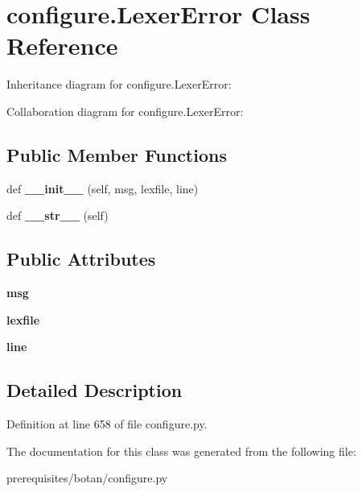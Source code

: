 \hypertarget{classconfigure_1_1_lexer_error}{}\section{configure.\+Lexer\+Error Class Reference}
\label{classconfigure_1_1_lexer_error}


Inheritance diagram for configure.\+Lexer\+Error\+:


Collaboration diagram for configure.\+Lexer\+Error\+:
\subsection*{Public Member Functions}
\begin{DoxyCompactItemize}
\item 
\mbox{\label{classconfigure_1_1_lexer_error_a1b7918032b3f84f04bd36fb068bbb0ce}} 
def {\bfseries \+\_\+\+\_\+init\+\_\+\+\_\+} (self, msg, lexfile, line)
\item 
\mbox{\label{classconfigure_1_1_lexer_error_af0750d0b6d213a8e76e6425e4654007c}} 
def {\bfseries \+\_\+\+\_\+str\+\_\+\+\_\+} (self)
\end{DoxyCompactItemize}
\subsection*{Public Attributes}
\begin{DoxyCompactItemize}
\item 
\mbox{\label{classconfigure_1_1_lexer_error_a9c246d550c7159c6b457ced90dce5b0a}} 
{\bfseries msg}
\item 
\mbox{\label{classconfigure_1_1_lexer_error_ae4ec849b5a31b24112a5c800f73c8126}} 
{\bfseries lexfile}
\item 
\mbox{\label{classconfigure_1_1_lexer_error_aaa83895ca223bbc52cc58b8549306819}} 
{\bfseries line}
\end{DoxyCompactItemize}


\subsection{Detailed Description}


Definition at line 658 of file configure.\+py.



The documentation for this class was generated from the following file\+:\begin{DoxyCompactItemize}
\item 
prerequisites/botan/configure.\+py\end{DoxyCompactItemize}
